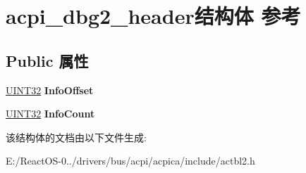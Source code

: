 \hypertarget{structacpi__dbg2__header}{}\section{acpi\+\_\+dbg2\+\_\+header结构体 参考}
\label{structacpi__dbg2__header}
\subsection*{Public 属性}
\begin{DoxyCompactItemize}
\item 
\mbox{\label{structacpi__dbg2__header_ace12e96ef8ca36e368a80d338a95ae8f}} 
\hyperlink{_processor_bind_8h_ae1e6edbbc26d6fbc71a90190d0266018}{U\+I\+N\+T32} {\bfseries Info\+Offset}
\item 
\mbox{\label{structacpi__dbg2__header_a5470c2be2236b7e78dea3a28c691de92}} 
\hyperlink{_processor_bind_8h_ae1e6edbbc26d6fbc71a90190d0266018}{U\+I\+N\+T32} {\bfseries Info\+Count}
\end{DoxyCompactItemize}


该结构体的文档由以下文件生成\+:\begin{DoxyCompactItemize}
\item 
E\+:/\+React\+O\+S-\/0../drivers/bus/acpi/acpica/include/actbl2.\+h\end{DoxyCompactItemize}
